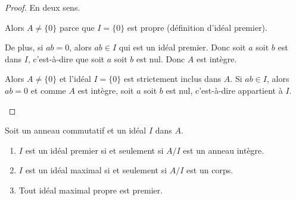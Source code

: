 \begin{proof}
    En deux sens.
    \begin{subproof}
    \item[Si \( \{ 0 \}\) est premier]
        Alors \( A\neq \{ 0 \}\) parce que \( I=\{ 0 \}\) est propre (définition d'idéal premier).
        
        De plus, si \( ab=0\), alors \( ab\in I\) qui est un idéal premier. Donc soit \( a\) soit \( b\) est dans \( I\), c'est-à-dire que soit \( a\) soit \( b\) est nul. Donc \( A\) est intègre.

    \item[Si \( A\) est intègre]

        Alors \( A\neq \{ 0 \}\) et l'idéal \( I=\{ 0 \}\) est strictement inclus dans \( A\). Si \( ab\in I\), alors \( ab=0\) et comme \( A\) est intègre, soit \( a\) soit \( b\) est nul, c'est-à-dire appartient à \( I\).
    \end{subproof}
\end{proof}

\begin{proposition}      \label{PROPooRUQKooIfbnQX}   \label{PROPooHABIooBZZQMj}
    Soit un anneau commutatif et un idéal \( I\) dans \( A\).
    \begin{enumerate}
        \item       \label{ITEMooUGBTooOGrnWl}
            \( I\) est un idéal premier si et seulement si \( A/I\) est un anneau intègre.
        \item   \label{ITEMooGLXSooUjINqR}
            \( I\) est un idéal maximal si et seulement si \( A/I\) est un corps.
        \item       \label{ITEMooTFFQooOUajFw}
            Tout idéal maximal propre est premier.
    \end{enumerate}
\end{proposition}


